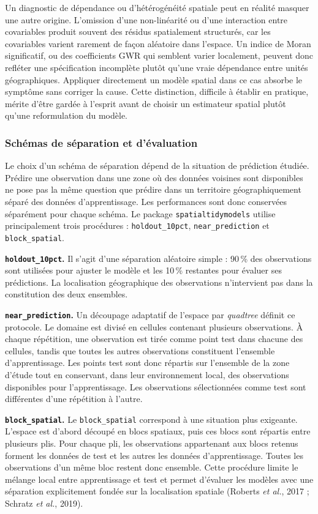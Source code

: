 \documentclass[11pt,a4paper]{article}
\begin{document}
Un diagnostic de dépendance ou d'hétérogénéité spatiale peut en réalité masquer une autre origine. L'omission d'une non-linéarité ou d'une interaction entre covariables produit souvent des résidus spatialement structurés, car les covariables varient rarement de façon aléatoire dans l'espace. Un indice de Moran significatif, ou des coefficients GWR qui semblent varier localement, peuvent donc refléter une spécification incomplète plutôt qu'une vraie dépendance entre unités géographiques. Appliquer directement un modèle spatial dans ce cas absorbe le symptôme sans corriger la cause. Cette distinction, difficile à établir en pratique, mérite d'être gardée à l'esprit avant de choisir un estimateur spatial plutôt qu'une reformulation du modèle.


\subsubsection{Schémas de séparation et d'évaluation}

Le choix d'un schéma de séparation dépend de la situation de prédiction étudiée. Prédire une observation dans une zone où des données voisines sont disponibles ne pose pas la même question que prédire dans un territoire géographiquement séparé des données d'apprentissage. Les performances sont donc conservées séparément pour chaque schéma. Le package \texttt{spatialtidymodels} utilise principalement trois procédures : \texttt{holdout\_10pct}, \texttt{near\_prediction} et \texttt{block\_spatial}.

\textbf{\texttt{holdout\_10pct}.}
Il s'agit d'une séparation aléatoire simple : 90\,\% des observations sont utilisées pour ajuster le modèle et les 10\,\% restantes pour évaluer ses prédictions. La localisation géographique des observations n'intervient pas dans la constitution des deux ensembles.

\textbf{\texttt{near\_prediction}.}
Un découpage adaptatif de l'espace par \textit{quadtree} définit ce protocole. Le domaine est divisé en cellules contenant plusieurs observations. À chaque répétition, une observation est tirée comme point test dans chacune des cellules, tandis que toutes les autres observations constituent l'ensemble d'apprentissage. Les points test sont donc répartis sur l'ensemble de la zone d'étude tout en conservant, dans leur environnement local, des observations disponibles pour l'apprentissage. Les observations sélectionnées comme test sont différentes d'une répétition à l'autre.

\textbf{\texttt{block\_spatial}.}
Le \texttt{block\_spatial} correspond à une situation plus exigeante. L'espace est d'abord découpé en blocs spatiaux, puis ces blocs sont répartis entre plusieurs plis. Pour chaque pli, les observations appartenant aux blocs retenus forment les données de test et les autres les données d'apprentissage. Toutes les observations d'un même bloc restent donc ensemble. Cette procédure limite le mélange local entre apprentissage et test et permet d'évaluer les modèles avec une séparation explicitement fondée sur la localisation spatiale (Roberts \textit{et al.}, 2017 ; Schratz \textit{et al.}, 2019).
\end{document}
